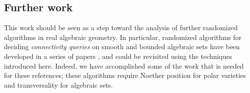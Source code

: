 \documentclass[12pt]{article}
\begin{document}
\subsection{Further work}
This work should be seen as a step toward the analysis of
further randomized algorithms in real algebraic geometry.  In particular, randomized algorithms for deciding {\em
  connectivity queries} on smooth and bounded algebraic sets have been
developed in a series of papers
\cite{SchostMohabBabySteps2011,SchostMohabBabySteps2014}, and could be
revisited using the techniques introduced here. Indeed, we have accomplished some of the work that is needed for these references; these algorithms require Noether position for polar varieties and transversality for algebraic sets. 








\end{document}
